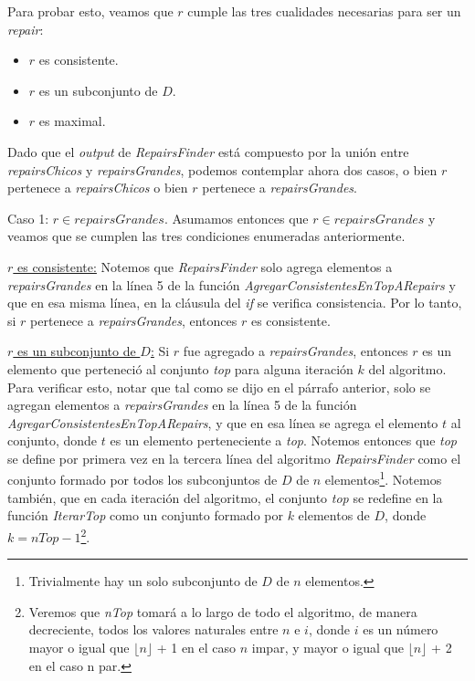\documentclass[11pt,a4paper,twoside]{tesis}
\begin{document}
Para probar esto, veamos que $r$ cumple las tres cualidades necesarias para ser un \textit{repair}:

\begin{itemize}
    \item $r$ es consistente.
    \item $r$ es un subconjunto de $D$.
    \item $r$ es maximal. 
\end{itemize}

Dado que el \textit{output} de \textit{RepairsFinder} está compuesto por la unión entre \textit{repairsChicos} y \textit{repairsGrandes}, podemos contemplar ahora dos casos, o bien $r$ pertenece a \textit{repairsChicos} o bien $r$ pertenece a \textit{repairsGrandes}.

Caso 1: $r \in repairsGrandes$. Asumamos entonces que $r \in repairsGrandes$ y veamos que se cumplen las tres condiciones enumeradas anteriormente.

\underline{$r$ es consistente:} Notemos que \textit{RepairsFinder} solo agrega elementos a \textit{repairsGrandes} en la línea 5 de la función \textit{AgregarConsistentesEnTopARepairs} y que en esa misma línea, en la cláusula del \textit{if} se verifica consistencia. Por lo tanto,  si $r$ pertenece a \textit{repairsGrandes}, entonces $r$ es consistente.

\underline{$r$ es un subconjunto de $D$:} Si $r$ fue agregado a \textit{repairsGrandes}, entonces $r$ es un elemento que perteneció al conjunto \textit{top} para alguna iteración $k$ del algoritmo. Para verificar esto, notar que tal como se dijo en el párrafo anterior, solo se agregan elementos a \textit{repairsGrandes} en la línea 5 de la función \textit{AgregarConsistentesEnTopARepairs}, y que en esa línea se agrega el elemento $t$ al conjunto, donde $t$ es un elemento perteneciente a \textit{top}. Notemos entonces que \textit{top} se define por primera vez en la tercera línea del algoritmo \textit{RepairsFinder} como el conjunto formado por todos los subconjuntos de $D$ de $n$ elementos\footnote{Trivialmente hay un solo subconjunto de $D$ de $n$ elementos.}. Notemos también, que en cada iteración del algoritmo, el conjunto \textit{top} se redefine en la función \textit{IterarTop} como un conjunto formado por $k$ elementos de $D$, donde $k = nTop - 1$\footnote{Veremos que \textit{nTop} tomará a lo largo de todo el algoritmo, de manera decreciente, todos los valores naturales entre $n$ e $i$, donde $i$ es un número mayor o igual que $\lfloor n \rfloor$ + 1 en el caso $n$ impar, y mayor o igual que  $\lfloor n \rfloor$ + 2 en el caso n par.}.
\end{document}
